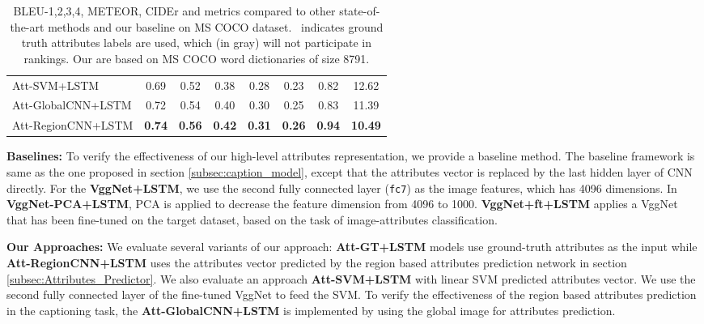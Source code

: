 \documentclass[10pt,journal,compsoc]{IEEEtran}
\begin{document}
\begin{table}[t]
\begin{center}
{\begin{tabular}{ l c c c c c c|c}
Att-SVM+LSTM & 0.69 & 0.52 & 0.38  &0.28 & 0.23& 0.82&12.62  \\
Att-GlobalCNN+LSTM & 0.72  & 0.54  & 0.40   &0.30  & 0.25 & 0.83 &11.39    \\
    Att-RegionCNN+LSTM & \textbf{0.74} & \textbf{0.56} & \textbf{0.42}  & \textbf{0.31} & \textbf{0.26}& \textbf{0.94}& \textbf{10.49} \\ \hline
\end{tabular}}
      \vspace{-4pt}
      \caption{BLEU-1,2,3,4, METEOR, CIDEr and  metrics compared to other state-of-the-art methods and our baseline on MS COCO dataset. ~indicates ground truth attributes labels are used, which (in \colorbox[rgb]{0.7,0.7,0.7}{gray}) will not participate in rankings. Our  are based on MS COCO word dictionaries of size 8791.}
      \label{tab2}
      \vspace{-25pt}
\end{center}
\end{table}

\vspace{3pt}
\noindent\textbf{Baselines:}
To verify the effectiveness of our high-level attributes representation, we provide a baseline method. The baseline framework is same as the one proposed in section \ref{subsec:caption_model}, except that the attributes vector  is replaced by the last hidden layer of CNN directly. For the \textbf{VggNet+LSTM}, we use the second fully connected layer (\texttt{fc7}) as the image features, which has 4096 dimensions. In \textbf{VggNet-PCA+LSTM}, PCA is applied to decrease the feature dimension from 4096 to 1000. \textbf{VggNet+ft+LSTM} applies a VggNet that has been fine-tuned on the target dataset, based on the task of image-attributes classification.

\vspace{3pt}
\noindent\textbf{Our Approaches:}
We evaluate several variants of our approach: \textbf{Att-GT+LSTM} models use ground-truth attributes as the input while \textbf{Att-RegionCNN+LSTM} uses the attributes vector  predicted by the region based attributes prediction network in section \ref{subsec:Attributes_Predictor}. We also evaluate an approach \textbf{Att-SVM+LSTM} with linear SVM predicted attributes vector. We use the second fully connected layer of the fine-tuned VggNet to feed the SVM. To verify the effectiveness of the region based attributes prediction in the captioning task, the \textbf{Att-GlobalCNN+LSTM} is implemented by using the global image for attributes prediction.
\end{document}
